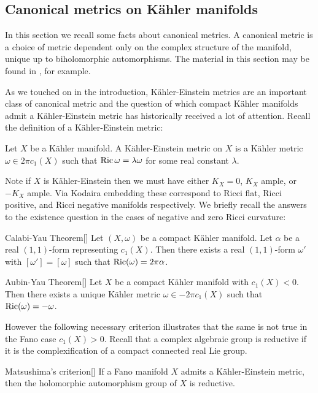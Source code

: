 \subsection{Canonical metrics on K\"ahler manifolds}
In this section we recall some facts about canonical metrics. A canonical metric is a choice of metric dependent only on the complex structure of the manifold, unique up to biholomorphic automorphisms. The material in this section may be found in \cite{szebook}, for example.

As we touched on in the introduction, K\"ahler-Einstein metrics are an important class of canonical metric and the question of which compact K\"ahler manifolds admit a K\"ahler-Einstein metric has historically received a lot of attention. Recall the definition of a K\"ahler-Einstein metric:
\begin{definition}
Let \(X\) be a K\"ahler manifold. A K\"ahler-Einstein metric on \(X\) is a K\"ahler metric \(\omega \in 2 \pi c_1(X)\) such that \(\mathop{\rm Ric}\nolimits \omega = \lambda \omega\) for some real constant \(\lambda\).
\end{definition}
Note if \(X\) is K\"ahler-Einstein then we must have either \(K_X = 0\), \(K_X\) ample, or \(-K_X\) ample. Via Kodaira embedding these correspond to Ricci flat, Ricci positive, and Ricci negative manifolds respectively. We briefly recall the answers to the existence question in the cases of negative and zero Ricci curvature:
\begin{namedthm}{Calabi-Yau Theorem}[\cite{yau1977calabi}]
Let \((X,\omega)\) be a compact K\"ahler manifold. Let \(\alpha\) be a real \((1,1)\)-form representing \(c_1(X)\). Then there exists a real \((1,1)\)-form \(\omega'\) with \([\omega'] = [\omega]\) such that \(\mathop{\rm Ric}\nolimits(\omega) = 2 \pi \alpha \).
\end{namedthm}
\begin{namedthm}{Aubin-Yau Theorem}[\cite{Aubin1976}]
Let \(X\) be a compact K\"ahler manifold with \(c_1(X) < 0 \). Then there exists a unique K\"ahler metric \(\omega \in -2 \pi c_1(X)\) such that \(\mathop{\rm Ric}\nolimits(\omega) = -\omega\).
\end{namedthm}
However the following necessary criterion illustrates that the same is not true in the Fano case \(c_1(X)> 0\). Recall that a complex algebraic group is reductive if it is the complexification of a compact connected real Lie group.
\begin{namedthm}{Matsushima's criterion}[\cite{matsushima1957structure}]
If a Fano manifold \(X\) admits a K\"ahler-Einstein metric, then the holomorphic automorphism group of \(X\) is reductive.\end{namedthm}
